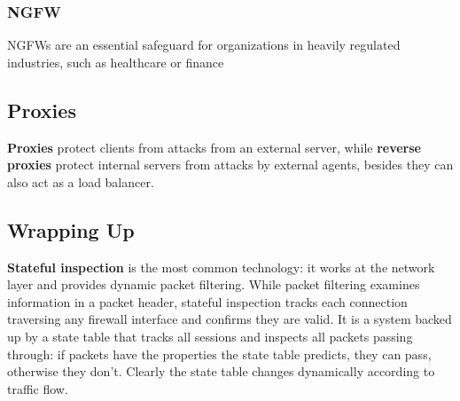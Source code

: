 \subsubsection{NGFW}
\begin{paracol}{2}
   \vspace{\fill}
   \vspace{\fill}
   \switchcolumn
   \vspace{\fill}
   \vspace{\fill}
\end{paracol}
NGFWs are an essential safeguard for organizations in heavily
regulated industries, such as healthcare or finance

\subsection*{Proxies}
\textbf{Proxies} protect clients from attacks from an external server,
while \textbf{reverse proxies} protect internal servers from attacks by external agents, 
besides they can also act as a load balancer.

\subsection{Wrapping Up}
\textbf{Stateful inspection} is the most common technology:
it works at the network layer and provides
dynamic packet filtering.
While packet filtering examines information in a
packet header, stateful inspection tracks each connection traversing any
firewall interface and confirms they are valid.
It is a system backed up by a state table that
tracks all sessions and inspects all packets passing through: 
if packets have
the properties the state table predicts, they can pass, otherwise they don't.
Clearly the state table changes
dynamically according to traffic flow.

